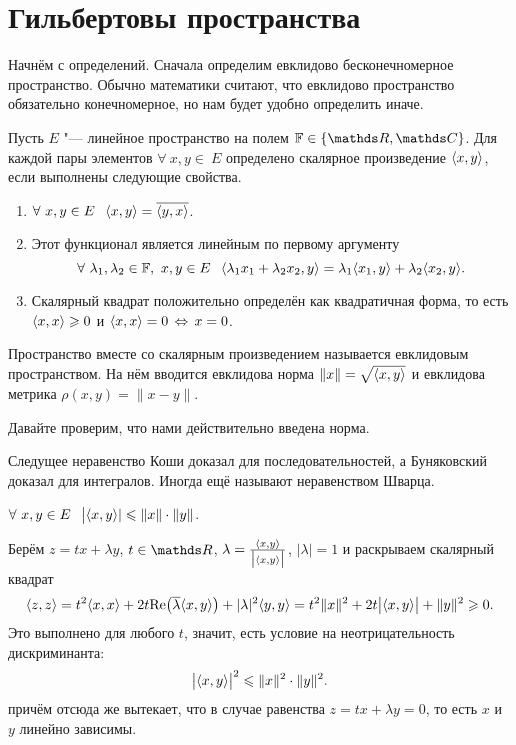 \section{Гильбертовы пространства}
Начнём с определений. Сначала определим евклидово бесконечномерное пространство. Обычно математики считают, что евклидово пространство обязательно конечномерное, но нам будет удобно определить иначе.

\begin{Def}
  Пусть $E$ "--- линейное пространство на полем $\F\in\{\R,\C\}$. Для каждой пары элементов $\forall\ x,y\in\ E$ определено скалярное произведение $\langle x,y\rangle $, если выполнены следующие свойства.
\begin{enumerate}
  \item $\forall\ x,y\in E\pau \la x,y\ra  = \ol{\la y,x\ra }$.

  \item Этот функционал является линейным по первому аргументу
  \[
     \forall\ \lambda_1,\lambda_2\in\mathbb F,\ x,y\in E\hskip .75em plus.1em minus.08em\relax \langle \lambda_1 x_1 + \lambda_2 x_2,y\rangle  = \lambda_1 \langle x_1,y\rangle  + \lambda_2 \langle x_2,y\rangle .
  \]
  \item Скалярный квадрат положительно определён как квадратичная форма, то есть $\langle x,x\rangle \geqslant 0$ и $\langle x,x\rangle =0\,\Leftrightarrow\, x=0$.
\end{enumerate}
Пространство вместе со скалярным произведением называется евклидовым пространством. На нём вводится евклидова норма $\|x\| = \sqrt{\langle x,y\rangle }$ и евклидова метрика $\rho(x,y) = \|x-y\|$.
\end{Def}

Давайте проверим, что нами действительно введена норма.

Следущее неравенство Коши доказал для последовательностей, а Буняковский доказал для интегралов. Иногда ещё называют неравенством Шварца.
\begin{Ut}
  $\forall\ x,y\in E\pau \big|\la x,y\ra |\le \|x\|\cdot \|y\|$.
\end{Ut}
\begin{Proof}
 Берём $z = tx + \lambda y$, $t\in \R$, $\lambda = \frac{\langle x,y\rangle }{\big|\langle x,y\rangle \big|}$, $|\lambda|=1$ и раскрываем скалярный квадрат
\[
  \langle z,z\rangle  = t^2\langle x,x\rangle  + 2t \mathrm{\mathop{Re}}\big(\overline{\lambda}\langle x,y\rangle \big) + |\lambda|^2\langle y,y\rangle  =
  t^2\|x\|^2 + 2t\big|\langle x,y\rangle \big|+\|y\|^2\geqslant 0.
\]
Это выполнено для любого $t$, значит, есть условие на неотрицательность дискриминанта:
\[
  \big|\langle x,y\rangle \big|^2\leqslant \|x\|^2\cdot \|y\|^2.
\]
причём отсюда же вытекает, что в случае равенства $z = tx+\lambda y=0$, то есть $x$ и $y$ линейно зависимы.
\end{Proof}

